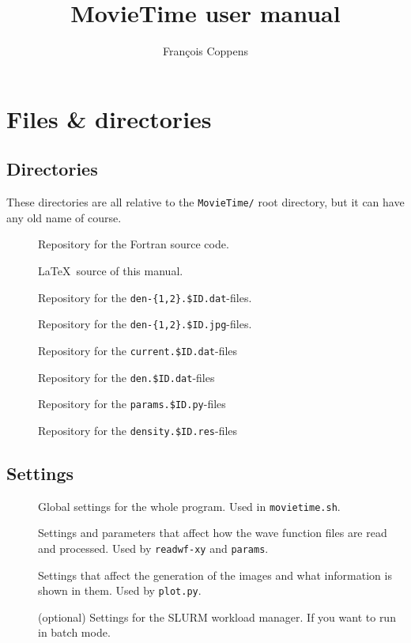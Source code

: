 \documentclass[10pt,a4paper]{article}
\author{François Coppens}
\title{MovieTime user manual}
\begin{document}
\maketitle
\date
\tableofcontents
\section{Files \& directories}  
\subsection{Directories}
These directories are all relative to the \verb+MovieTime/+ root directory, but it can have any old name of course. 
\begin{description}
    \item[] Repository for the Fortran source code.
    \item[] \LaTeX $\,$ source of this manual.
    \item[] Repository for the \verb+den-{1,2}.$ID.dat+-files.
    \item[] Repository for the \verb+den-{1,2}.$ID.jpg+-files.
    \item[] Repository for the \verb+current.$ID.dat+-files
    \item[] Repository for the \verb+den.$ID.dat+-files
    \item[] Repository for the \verb+params.$ID.py+-files
    \item[] Repository for the \verb+density.$ID.res+-files
\end{description}
    	
\subsection{Settings}
\begin{description}
    \item[] Global settings for the whole program. Used in \verb+movietime.sh+.
    \item[] Settings and parameters that affect how the wave function files are read and processed. Used by \verb+readwf-xy+ and \verb+params+.
    \item[] Settings that affect the generation of the images and what information is shown in them. Used by \verb+plot.py+.
    \item[] (optional) Settings for the SLURM workload manager. If you want to run in batch mode.
\end{description}
\end{document}
